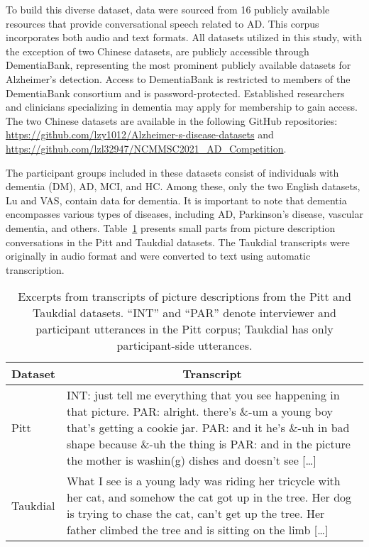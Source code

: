 To build this diverse dataset, data were sourced from 16 publicly available resources that provide conversational speech related to AD. This corpus incorporates both audio and text formats. All datasets utilized in this study, with the exception of two Chinese datasets, are publicly accessible through DementiaBank, representing the most prominent publicly available datasets for Alzheimer's detection.
Access to DementiaBank is restricted to members of the DementiaBank consortium and is password-protected. Established researchers and clinicians specializing in dementia may apply for membership to gain access. The two Chinese datasets are available in the following GitHub repositories: \url{https://github.com/lzy1012/Alzheimer-s-disease-datasets} and \url{https://github.com/lzl32947/NCMMSC2021_AD_Competition}. 

The participant groups included in these datasets consist of individuals with dementia (DM), AD, MCI, and HC. Among these, only the two English datasets, Lu and VAS, contain data for dementia. It is important to note that dementia encompasses various types of diseases, including AD, Parkinson's disease, vascular dementia, and others. Table~\ref{tab:dataset_transcript} presents small parts from picture description conversations in the Pitt and Taukdial datasets. The Taukdial transcripts were originally in audio format and were converted to text using automatic transcription.

\begin{table}[t]
    \caption{Excerpts from transcripts of picture descriptions from the Pitt and Taukdial datasets. ``INT'' and ``PAR'' denote interviewer and participant utterances in the Pitt corpus; Taukdial has only participant-side utterances.}
    \centering
    \begin{tabular}{|p{1cm}|p{7cm}|}  %
        \hline
        \multicolumn{1}{|c|}{\textbf{Dataset}} & \multicolumn{1}{c|}{\textbf{Transcript}} \\  
        \hline
        Pitt & INT: just tell me everything that you see happening in that picture. PAR: alright. there's \&-um a young boy that's getting a cookie jar. PAR: and it he's \&-uh in bad shape because \&-uh the thing is PAR: and in the picture the mother is washin(g) dishes and doesn't see [\dots] \\  
        \hline
        Taukdial & What I see is a young lady was riding her tricycle with her cat, and somehow the cat got up in the tree. Her dog is trying to chase the cat, can't get up the tree. Her father climbed the tree and is sitting on the limb [\dots] \\  
        \hline
    \end{tabular}\label{tab:dataset_transcript}
\end{table}

